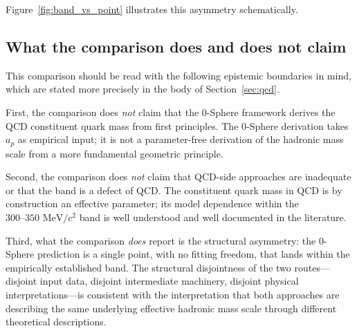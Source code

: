 \documentclass[%
 reprint, amsmath,amssymb, aps, prc, ]{revtex4-2}
\numberwithin{equation}{section}
\begin{document}
Figure~\ref{fig:band_vs_point} illustrates this asymmetry schematically.

\subsection{What the comparison does and does not claim}

This comparison should be read with the following epistemic boundaries in mind, which are stated more precisely in the body of Section~\ref{sec:qcd}.

First, the comparison does \emph{not} claim that the 0-Sphere framework derives the QCD constituent quark mass from first principles. The 0-Sphere derivation takes $a_p$ as empirical input; it is not a parameter-free derivation of the hadronic mass scale from a more fundamental geometric principle.

Second, the comparison does \emph{not} claim that QCD-side approaches are inadequate or that the band is a defect of QCD. The constituent quark mass in QCD is by construction an effective parameter; its model dependence within the $300\text{--}350 \text{ MeV}/c^2$ band is well understood and well documented in the literature.

Third, what the comparison \emph{does} report is the structural asymmetry: the 0-Sphere prediction is a single point, with no fitting freedom, that lands within the empirically established band. The structural disjointness of the two routes---disjoint input data, disjoint intermediate machinery, disjoint physical interpretations---is consistent with the interpretation that both approaches are describing the same underlying effective hadronic mass scale through different theoretical descriptions.
\end{document}
